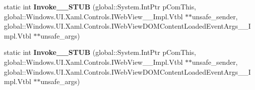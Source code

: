 \begin{DoxyCompactItemize}
\mbox{\label{struct_windows_1_1_foundation_1_1_typed_event_handler___a___windows___u_i___xaml___controls___we5ac43aef74fa54d3107343c3c79b75ac_aa98cd590d255e23e001dbf65280ae500}} 
static int {\bfseries Invoke\+\_\+\+\_\+\+S\+T\+UB} (global\+::\+System.\+Int\+Ptr p\+Com\+This, global\+::\+Windows.\+U\+I.\+Xaml.\+Controls.\+I\+Web\+View\+\_\+\+\_\+\+Impl.\+Vtbl $\ast$$\ast$unsafe\+\_\+sender, global\+::\+Windows.\+U\+I.\+Xaml.\+Controls.\+I\+Web\+View\+D\+O\+M\+Content\+Loaded\+Event\+Args\+\_\+\+\_\+\+Impl.\+Vtbl $\ast$$\ast$unsafe\+\_\+args)
\item 
\mbox{\label{struct_windows_1_1_foundation_1_1_typed_event_handler___a___windows___u_i___xaml___controls___we5ac43aef74fa54d3107343c3c79b75ac_aa98cd590d255e23e001dbf65280ae500}} 
static int {\bfseries Invoke\+\_\+\+\_\+\+S\+T\+UB} (global\+::\+System.\+Int\+Ptr p\+Com\+This, global\+::\+Windows.\+U\+I.\+Xaml.\+Controls.\+I\+Web\+View\+\_\+\+\_\+\+Impl.\+Vtbl $\ast$$\ast$unsafe\+\_\+sender, global\+::\+Windows.\+U\+I.\+Xaml.\+Controls.\+I\+Web\+View\+D\+O\+M\+Content\+Loaded\+Event\+Args\+\_\+\+\_\+\+Impl.\+Vtbl $\ast$$\ast$unsafe\+\_\+args)
\end{DoxyCompactItemize}
